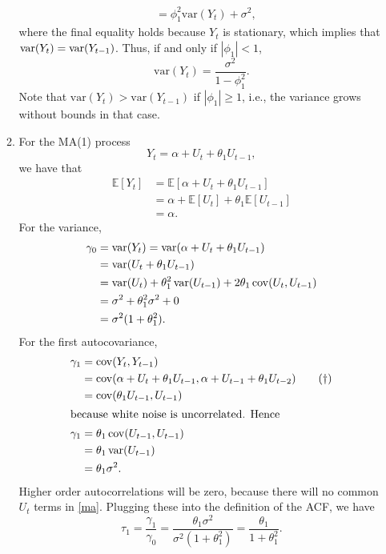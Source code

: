 \documentclass[11pt, a4paper]{article}
\newcommand{\E}{\ensuremath{{\mathbb E}}} %
\def\func#1{\mathop{\rm #1}}
\begin{document}
\begin{enumerate}
\begin{enumerate}
\begin{align*}
&= \phi_1^2 \mathrm{var}(Y_{t}) +
\sigma^2,
\end{align*}
where the final equality holds because $Y_t$ is stationary, which implies that $\func{var}(Y_t)=\func{var}(Y_{t-1})$. Thus, if and only if $|\phi_1 |<1$,
\begin{equation*}
\mathrm{var}(Y_t) = \frac{\sigma^2}{1-\phi_1^2}.
\end{equation*}
Note that $\mathrm{var}(Y_t) > \mathrm{var}(Y_{t-1})$ if $|\phi_1 |\ge 1$, i.e., the variance grows without bounds in that case.
\item For the MA(1) process
\begin{equation*}
Y_t=\alpha + U_t + \theta_1 U_{t-1},
\end{equation*}
we have that
\begin{align*}
\E[Y_t]&=\E[\alpha + U_t + \theta_1 U_{t-1}]\\
&=\alpha + \E[U_t] + \theta_1 \E[U_{t-1}]\\
&=\alpha.
\end{align*}
For the variance,
\begin{align*}
\gamma_0&=\func{var}(Y_t)=\func{var}(\alpha + U_t + \theta_1 U_{t-1})\\
&=\func{var}(U_t + \theta_1 U_{t-1})\\
&=\func{var}(U_t) + \theta_1^2\func{var}( U_{t-1})+2\theta_1\func{cov}(U_t, U_{t-1})\\
&=\sigma^2+\theta_1^2\sigma^2+0\\
&=\sigma^2(1+\theta_1^2).
\end{align*}
For the first autocovariance,
\begin{align*}
\gamma_1&=\func{cov}(Y_t, Y_{t-1})\\
&=\func{cov}(\alpha + U_t + \theta_1 U_{t-1}, \alpha + U_{t-1} + \theta_1 U_{t-2})\tag{$\dagger$}\label{ma}\\
&=\func{cov}(\theta_1 U_{t-1},U_{t-1})\\
\intertext{because white noise is uncorrelated. Hence}
\gamma_1&=\theta_1\func{cov}( U_{t-1},U_{t-1})\\
&=\theta_1\func{var}(U_{t-1})\\
&=\theta_1\sigma^2.
\end{align*}
Higher order autocorrelations will be zero, because there will no common $U_t$ terms in \eqref{ma}.
Plugging these into the definition of the ACF, we have
\[
\tau_1=\frac{\gamma_1}{\gamma_0}=\frac{\theta_1\sigma^2}{\sigma^2(1+\theta_1^2)}=\frac{\theta_1}{1+\theta_1^2}.
\]



\end{enumerate}
\end{enumerate}
\end{document}
